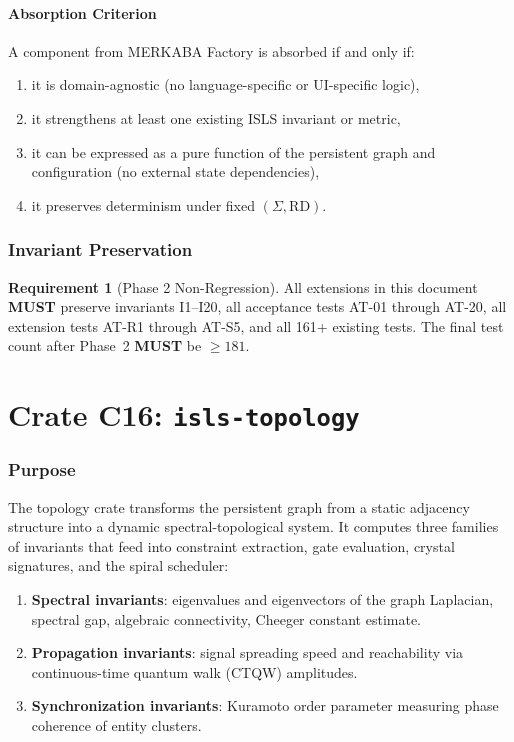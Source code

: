 \documentclass[11pt,a4paper,twoside]{article}
\theoremstyle{definition}
\newtheorem{requirement}{Requirement}[section]
\theoremstyle{plain}
\theoremstyle{remark}
\newcommand{\ISLS}{\textsf{ISLS}}
\begin{document}
\subsection{Absorption Criterion}

A component from MERKABA Factory is absorbed if and only if:
\begin{enumerate}[nosep,label=(\roman*)]
  \item it is domain-agnostic (no language-specific or UI-specific logic),
  \item it strengthens at least one existing \ISLS{} invariant or metric,
  \item it can be expressed as a pure function of the persistent graph
        and configuration (no external state dependencies),
  \item it preserves determinism under fixed $(\Sigma, \mathrm{RD})$.
\end{enumerate}

\section{Invariant Preservation}

\begin{requirement}[Phase 2 Non-Regression]\label{req:p2nonreg}
All extensions in this document \textbf{MUST} preserve invariants
I1--I20, all acceptance tests AT-01 through AT-20, all extension tests
AT-R1 through AT-S5, and all 161+ existing tests. The final test count
after Phase~2 \textbf{MUST} be $\ge 181$.
\end{requirement}


\part{Crate C16: \texttt{isls-topology}}\label{part:topology}

\section{Purpose}\label{sec:topo:purpose}

The topology crate transforms the persistent graph from a static
adjacency structure into a dynamic spectral-topological system. It
computes three families of invariants that feed into constraint
extraction, gate evaluation, crystal signatures, and the spiral
scheduler:

\begin{enumerate}[nosep,label=(\alph*)]
  \item \textbf{Spectral invariants}: eigenvalues and eigenvectors of
        the graph Laplacian, spectral gap, algebraic connectivity,
        Cheeger constant estimate.
  \item \textbf{Propagation invariants}: signal spreading speed and
        reachability via continuous-time quantum walk (CTQW) amplitudes.
  \item \textbf{Synchronization invariants}: Kuramoto order parameter
        measuring phase coherence of entity clusters.
\end{enumerate}
\end{document}
